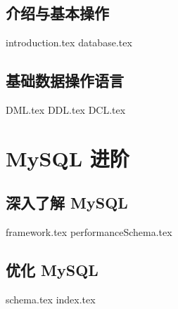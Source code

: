 \documentclass{PionpillNote-book}
\begin{document}
\chapter{介绍与基本操作}
{introduction.tex}
{database.tex}
\chapter{基础数据操作语言}
{DML.tex}
{DDL.tex}
{DCL.tex}

\part{MySQL 进阶}
\chapter{深入了解 MySQL}
{framework.tex}
{performanceSchema.tex}
\chapter{优化 MySQL}
{schema.tex}
{index.tex}
\end{document}
